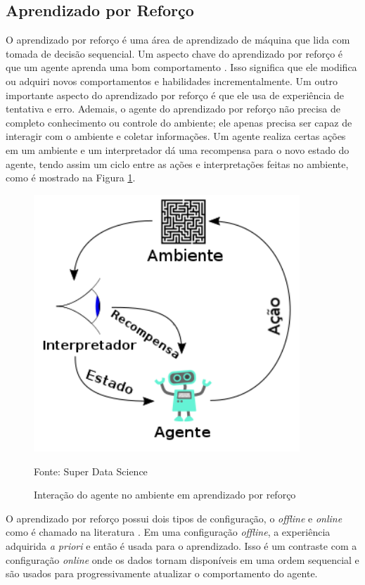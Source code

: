 \subsection{Aprendizado por Reforço}

O aprendizado por reforço é uma área de aprendizado de máquina que lida com tomada de decisão sequencial.
Um aspecto chave do aprendizado por reforço é que um agente aprenda uma bom comportamento \cite{franccois2018introduction}.
Isso significa que ele modifica ou adquiri novos comportamentos e habilidades incrementalmente.
Um outro importante aspecto do aprendizado por reforço é que ele usa de experiência de tentativa e erro.
Ademais, o agente do aprendizado por reforço não precisa de completo conhecimento ou controle do ambiente; ele apenas precisa ser capaz de interagir com o ambiente e coletar informações.
Um agente realiza certas ações em um ambiente e um interpretador dá uma recompensa para o novo estado do agente, tendo assim um ciclo entre as ações e interpretações feitas no ambiente, como é mostrado na Figura \ref{fig:ciclo_rl}.

\vspace{0.25cm}
\begin{figure}[H]
\caption{Interação do agente no ambiente em aprendizado por reforço}
\centerline{\includegraphics[width=10cm]{imagens/ciclo_rl_agente.png}}
\small{Fonte: Super Data Science}
\label{fig:ciclo_rl}
\end{figure}

O aprendizado por reforço possui dois tipos de configuração, o \textit{offline} e \textit{online} como é chamado na literatura \cite{sutton1998introduction}. Em uma configuração \textit{offline}, a experiência adquirida \textit{a priori} e então é usada para o aprendizado. Isso é um contraste com a configuração \textit{online} onde os dados tornam disponíveis em uma ordem sequencial e são usados para progressivamente atualizar o comportamento do agente.

